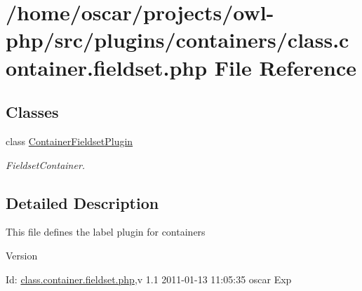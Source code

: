 \section{/home/oscar/projects/owl-\/php/src/plugins/containers/class.container.fieldset.php File Reference}
\label{class_8container_8fieldset_8php}
\subsection*{Classes}
\begin{DoxyCompactItemize}
\item 
class \hyperlink{classContainerFieldsetPlugin}{ContainerFieldsetPlugin}
\begin{DoxyCompactList}\small\item\em FieldsetContainer. \item\end{DoxyCompactList}\end{DoxyCompactItemize}


\subsection{Detailed Description}
This file defines the label plugin for containers \begin{DoxyVersion}{Version}

\end{DoxyVersion}
\begin{DoxyParagraph}{Id:}
\hyperlink{class_8container_8fieldset_8php}{class.container.fieldset.php},v 1.1 2011-\/01-\/13 11:05:35 oscar Exp 
\end{DoxyParagraph}

